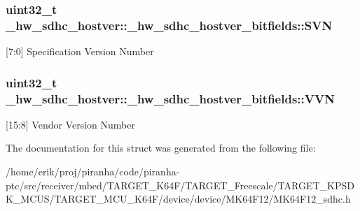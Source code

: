 \subsubsection[{\texorpdfstring{S\+VN}{SVN}}]{\setlength{\rightskip}{0pt plus 5cm}uint32\+\_\+t \+\_\+hw\+\_\+sdhc\+\_\+hostver\+::\+\_\+hw\+\_\+sdhc\+\_\+hostver\+\_\+bitfields\+::\+S\+VN}\hypertarget{struct__hw__sdhc__hostver_1_1__hw__sdhc__hostver__bitfields_a3f4c8ae2c696ad186ad0394b914e500f}{}\label{struct__hw__sdhc__hostver_1_1__hw__sdhc__hostver__bitfields_a3f4c8ae2c696ad186ad0394b914e500f}
\mbox{[}7\+:0\mbox{]} Specification Version Number 
\subsubsection[{\texorpdfstring{V\+VN}{VVN}}]{\setlength{\rightskip}{0pt plus 5cm}uint32\+\_\+t \+\_\+hw\+\_\+sdhc\+\_\+hostver\+::\+\_\+hw\+\_\+sdhc\+\_\+hostver\+\_\+bitfields\+::\+V\+VN}\hypertarget{struct__hw__sdhc__hostver_1_1__hw__sdhc__hostver__bitfields_a05d4ebc89a47546d0fe9148888961d2e}{}\label{struct__hw__sdhc__hostver_1_1__hw__sdhc__hostver__bitfields_a05d4ebc89a47546d0fe9148888961d2e}
\mbox{[}15\+:8\mbox{]} Vendor Version Number 

The documentation for this struct was generated from the following file\+:\begin{DoxyCompactItemize}
\item 
/home/erik/proj/piranha/code/piranha-\/ptc/src/receiver/mbed/\+T\+A\+R\+G\+E\+T\+\_\+\+K64\+F/\+T\+A\+R\+G\+E\+T\+\_\+\+Freescale/\+T\+A\+R\+G\+E\+T\+\_\+\+K\+P\+S\+D\+K\+\_\+\+M\+C\+U\+S/\+T\+A\+R\+G\+E\+T\+\_\+\+M\+C\+U\+\_\+\+K64\+F/device/device/\+M\+K64\+F12/M\+K64\+F12\+\_\+sdhc.\+h\end{DoxyCompactItemize}
